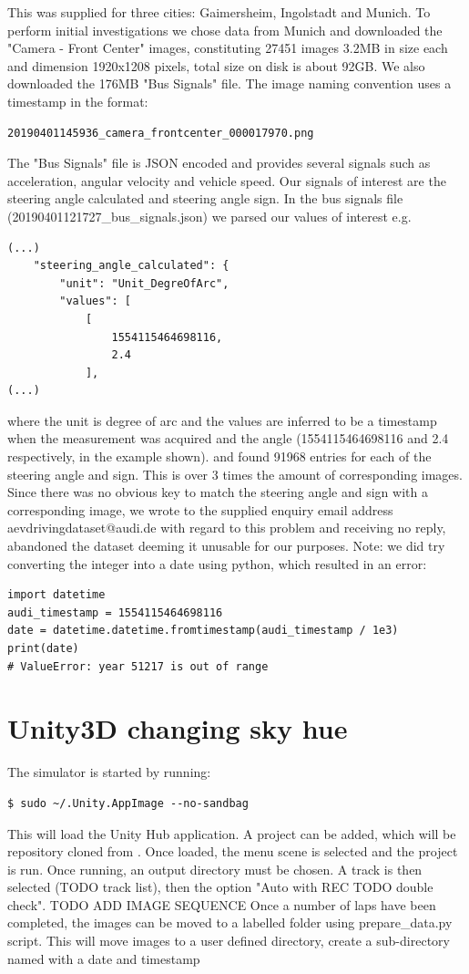 This was supplied for three cities: Gaimersheim, Ingolstadt and Munich. To perform initial investigations we chose data from Munich and downloaded the "Camera - Front Center" images, constituting 27451 images 3.2MB in size each and dimension 1920x1208 pixels, total size on disk is about 92GB. We also downloaded the 176MB "Bus Signals" file. The image naming convention uses a timestamp in the format:
\begin{verbatim}
20190401145936_camera_frontcenter_000017970.png
\end{verbatim}
The "Bus Signals" file is JSON encoded and provides several signals such as acceleration, angular velocity and vehicle speed. Our signals of interest are the steering angle calculated and steering angle sign. In the bus signals file (20190401121727\_bus\_signals.json) we parsed our values of interest e.g.
\begin{verbatim}
(...)
    "steering_angle_calculated": {
        "unit": "Unit_DegreOfArc",
        "values": [
            [
                1554115464698116,
                2.4
            ],
(...)
\end{verbatim}
where the unit is degree of arc and the values are inferred to be a timestamp when the measurement was acquired and the angle (1554115464698116 and 2.4 respectively, in the example shown).
and found 91968 entries for each of the steering angle and sign. This is over 3 times the amount of corresponding images. Since there was no obvious key to match the steering angle and sign with a corresponding image, we wrote to the supplied enquiry email address aevdrivingdataset@audi.de with regard to this problem and receiving no reply, abandoned the dataset deeming it unusable for our purposes.  
Note: we did try converting the integer into a date using python, which resulted in an error:
\begin{verbatim}
import datetime
audi_timestamp = 1554115464698116
date = datetime.datetime.fromtimestamp(audi_timestamp / 1e3)
print(date)
# ValueError: year 51217 is out of range    
\end{verbatim}


\section{Unity3D changing sky hue}
The simulator is started by running:
\begin{verbatim}
$ sudo ~/.Unity.AppImage --no-sandbag   
\end{verbatim}
This will load the Unity Hub application. A project can be added, which will be repository cloned from \cite{SDSandboxSim}. Once loaded, the menu scene is selected and the project is run. Once running, an output directory must be chosen. A track is then selected (TODO track list), then the option "Auto with REC TODO double check".  
TODO ADD IMAGE SEQUENCE  
Once a number of laps have been completed, the images can be moved to a labelled folder using prepare\_data.py script. This will move images to a user defined directory, create a sub-directory named with a date and timestamp

